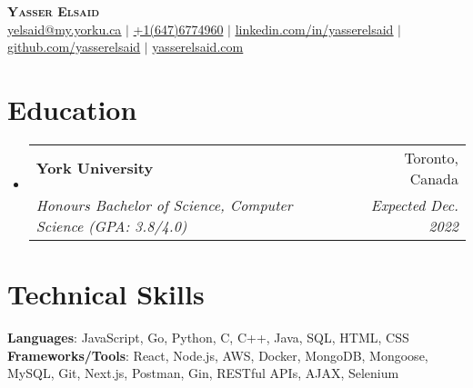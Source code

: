 \documentclass[letterpaper,11pt]{article}
\makeatletter
\newcommand{\resumeSubheading}[4]{
  \vspace{-2pt}\item
    \begin{tabular*}{0.97\textwidth}[t]{l@{\extracolsep{\fill}}r}
      \textbf{#1} & #2 \\
      \textit{\small#3} & \textit{\small #4} \\
    \end{tabular*}\vspace{-7pt}
}
\newcommand{\resumeSubHeadingListStart}{\begin{itemize}[leftmargin=0.15in, label={}]}
\newcommand{\resumeSubHeadingListEnd}{\end{itemize}}
\makeatother
\begin{document}

\begin{center}
    \textbf{\Huge \scshape Yasser Elsaid} \\ \vspace{1pt}
     \href{mailto:yelsaid@my.yorku.ca}{\underline{yelsaid@my.yorku.ca}} $|$ 
     \underline{+1(647)6774960} $|$ 
    \href{https://linkedin.com/in/yasserelsaid}{\underline{linkedin.com/in/yasserelsaid}} $|$
    \href{https://github.com/yasserelsaid}{\underline{github.com/yasserelsaid}} $|$
    \href{https://yasserelsaid.com}{\underline{yasserelsaid.com}}

\end{center}


\section{Education}
  \resumeSubHeadingListStart
    \resumeSubheading
      {York University}{Toronto, Canada}
      {Honours Bachelor of Science, Computer Science (GPA: 3.8/4.0)}{Expected Dec. 2022}
   
  \resumeSubHeadingListEnd

\section{Technical Skills}
\begin{itemize}[leftmargin=0.15in, label={}]
   \small{\item{
    \textbf{Languages}{: JavaScript, Go, Python, C, C++, Java, SQL, HTML, CSS} \\
    \textbf{Frameworks/Tools}{: React, Node.js, AWS, Docker, MongoDB, Mongoose, MySQL, Git, Next.js, Postman, Gin, RESTful APIs, AJAX, Selenium } \\
   }}
\end{itemize}


\end{document}
